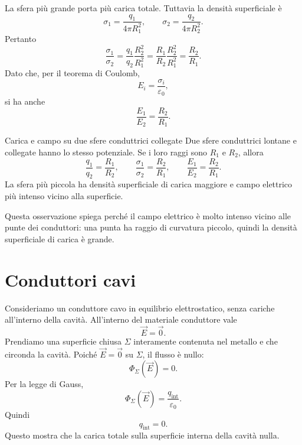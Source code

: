 \documentclass[a4paper]{article}
\begin{document}
La sfera più grande porta più carica totale. Tuttavia la densità superficiale è
\[
    \sigma_1=\frac{q_1}{4\pi R_1^2},
    \qquad
    \sigma_2=\frac{q_2}{4\pi R_2^2}.
\]
Pertanto
\[
    \frac{\sigma_1}{\sigma_2}
    =\frac{q_1}{q_2}\frac{R_2^2}{R_1^2}
    =\frac{R_1}{R_2}\frac{R_2^2}{R_1^2}
    =\frac{R_2}{R_1}.
\]
Dato che, per il teorema di Coulomb,
\[
    E_i=\frac{\sigma_i}{\varepsilon_0},
\]
si ha anche
\[
    \frac{E_1}{E_2}=\frac{R_2}{R_1}.
\]

\begin{snippetproposition}{Carica e campo su due sfere conduttrici collegate}
    Due sfere conduttrici lontane e collegate hanno lo stesso potenziale. Se i loro raggi sono \(R_1\) e \(R_2\), allora
    \[
        \frac{q_1}{q_2}=\frac{R_1}{R_2},
        \qquad
        \frac{\sigma_1}{\sigma_2}=\frac{R_2}{R_1},
        \qquad
        \frac{E_1}{E_2}=\frac{R_2}{R_1}.
    \]
    La sfera più piccola ha densità superficiale di carica maggiore e campo elettrico più intenso vicino alla superficie.
\end{snippetproposition}

\begin{center}
\end{center}

Questa osservazione spiega perché il campo elettrico è molto intenso vicino alle punte dei conduttori: una punta ha raggio di curvatura piccolo, quindi la densità superficiale di carica è grande.

\section{Conduttori cavi}

Consideriamo un conduttore cavo in equilibrio elettrostatico, senza cariche all'interno della cavità. All'interno del materiale conduttore vale
\[
    \vec{E}=\vec{0}.
\]
Prendiamo una superficie chiusa \(\Sigma\) interamente contenuta nel metallo e che circonda la cavità. Poiché \(\vec{E}=\vec{0}\) su \(\Sigma\), il flusso è nullo:
\[
    \Phi_\Sigma(\vec{E})=0.
\]
Per la legge di Gauss,
\[
    \Phi_\Sigma(\vec{E})=\frac{q_{\mathrm{int}}}{\varepsilon_0}.
\]
Quindi
\[
    q_{\mathrm{int}}=0.
\]
Questo mostra che la carica totale sulla superficie interna della cavità  nulla.
\end{document}

